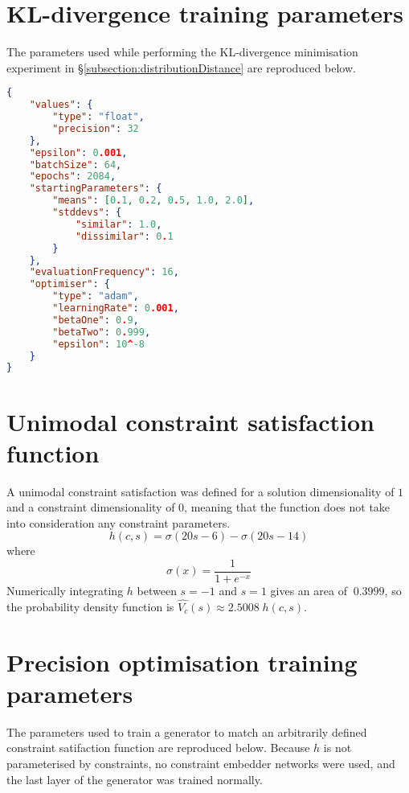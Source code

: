 \documentclass[../main.tex]{subfiles}
\begin{document}
\section{KL-divergence training parameters} \label{appendix:klTrainingParameters}

The parameters used while performing the KL-divergence minimisation experiment in \S\ref{subsection:distributionDistance} are reproduced below.

\begin{lstlisting}[language=json,firstnumber=1,caption={Experimental parameters for minimising the KL-divergence of two distributions.},captionpos=b]
{
    "values": {
        "type": "float",
        "precision": 32
    },
    "epsilon": 0.001,
    "batchSize": 64,
    "epochs": 2084,
    "startingParameters": {
        "means": [0.1, 0.2, 0.5, 1.0, 2.0],
        "stddevs": {
            "similar": 1.0,
            "dissimilar": 0.1
        }
    },
    "evaluationFrequency": 16,
    "optimiser": {
        "type": "adam",
        "learningRate": 0.001,
        "betaOne": 0.9,
        "betaTwo": 0.999,
        "epsilon": 10^-8
    }
}
\end{lstlisting}

\section{Unimodal constraint satisfaction function} \label{appendix:unimodalCSF}

A unimodal constraint satisfaction was defined for a solution dimensionality of $1$ and a constraint dimensionality of $0$, meaning that the function does not take into consideration any constraint parameters.
\begin{equation}
    h(c,s)=\sigma(20s-6)-\sigma(20s-14)
\end{equation}
where
\begin{equation}
    \sigma(x)=\frac{1}{1+e^{-x}}
\end{equation}
Numerically integrating $h$ between $s=-1$ and $s=1$ gives an area of $~0.3999$, so the probability density function is $\hat{V_c}(s)\approx2.5008\;h(c,s)$.

\section{Precision optimisation training parameters} \label{appendix:precisionOptimisationTrainingParameters}

The parameters used to train a generator to match an arbitrarily defined constraint satifaction function are reproduced below.
Because $h$ is not parameterised by constraints, no constraint embedder networks were used, and the last layer of the generator was trained normally.
\end{document}
